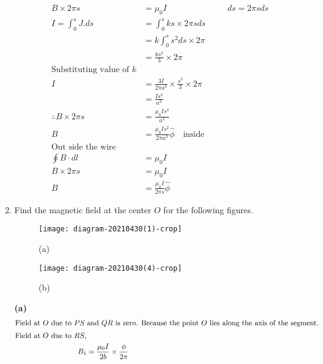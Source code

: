 \begin{enumerate}[ label=\color{ocre}\textbf{\arabic*.}]
\begin{answer}
\begin{align*}
		B\times2\pi s&=\mu_0I\hspace{3cm}ds=2\pi sds\\
		I=\int_{0}^{s}J.ds&=\int_{0}^{s}ks\times2\pi sds\\
		&=k\int_{0}^{s}s^2 ds\times2\pi\\
		&=\frac{ks^3}{3}\times2\pi\\
		\text{Substituting  value of }k\\
		I&=\frac{3 I}{2\pi a^3}\times\frac{s^3}{3}\times2\pi\\
		&=\frac{Is^3}{a^3}\\
		\therefore B\times2\pi s&=\frac{\mu_0Is^3}{a^3}\\
		B&=\frac{\mu_0Is^2}{2\pi a^3}\hat{\phi} \quad \text{inside}\\
		\text{Out side the wire}\\
		\oint B\cdot dl&=\mu_0I\\
		B\times2\pi s&=\mu_0I\\
		B&=\frac{\mu_0I}{2\pi s}\hat{\phi}
		\end{align*}
	\end{answer}
	\item Find the magnetic field at the center $O$ for the following figures.\\
	\begin{minipage}{0.45\textwidth}
		\begin{figure}[H]
			\begin{center}
				\texttt{[image: diagram-20210430(1)-crop]}
			\end{center}
			\caption{(a)}
		\end{figure}
	\end{minipage}
	\begin{minipage}{0.45\textwidth}
		\begin{figure}[H]
			\begin{center}
				\texttt{[image: diagram-20210430(4)-crop]}
			\end{center}
			\caption{(b)}
		\end{figure}
	\end{minipage}
	\begin{answer}
		\textbf{(a)}
		\begin{align*}
		\intertext{Field at $O$ due to $PS$ and $QR$ is zero. Because the point $O$ lies along the axis of the segment.}
		\text{Field at $O$ due to $RS$,}\\
		B_1&=\frac{\mu_0I}{2b}\times\frac{\phi}{2\pi}\\

\end{align*}
\end{answer}
\end{enumerate}
